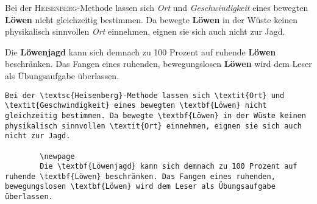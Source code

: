 \begin{frame}[fragile]
	\Losung
	\begin{outputbox}
		Bei der \textsc{Heisenberg}-Methode lassen sich \textit{Ort} und \textit{Geschwindigkeit} eines bewegten \textbf{Löwen} nicht gleichzeitig bestimmen. Da bewegte \textbf{Löwen} in der Wüste keinen physikalisch sinnvollen \textit{Ort} einnehmen, eignen sie sich auch nicht zur Jagd. 
	\end{outputbox}
    \linebreakrule
	\begin{outputbox}
		Die \textbf{Löwenjagd} kann sich demnach zu 100 Prozent auf ruhende \textbf{Löwen} beschränken. Das Fangen eines ruhenden, bewegungslosen \textbf{Löwen} wird dem Leser als Übungsaufgabe überlassen.
	\end{outputbox}

	\Code\btVFill
	\begin{lstlisting}[gobble=8]
		Bei der \textsc{Heisenberg}-Methode lassen sich \textit{Ort} und \textit{Geschwindigkeit} eines bewegten \textbf{Löwen} nicht gleichzeitig bestimmen. Da bewegte \textbf{Löwen} in der Wüste keinen physikalisch sinnvollen \textit{Ort} einnehmen, eignen sie sich auch nicht zur Jagd. 
		
		\newpage
		Die \textbf{Löwenjagd} kann sich demnach zu 100 Prozent auf ruhende \textbf{Löwen} beschränken. Das Fangen eines ruhenden, bewegungslosen \textbf{Löwen} wird dem Leser als Übungsaufgabe überlassen.
	\end{lstlisting}
	\vspace{0.3cm}
\end{frame}
